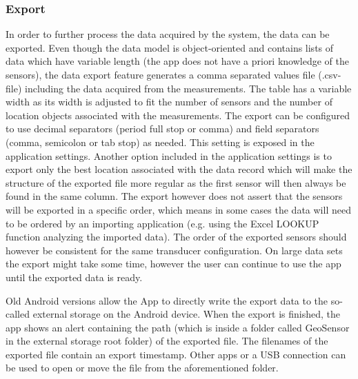\subsubsection{Export}
\label{subsubs:export}
In order to further process the data acquired by the system, the data can be exported. Even though the data model is object-oriented and contains lists of data which have variable length (the app does not have a priori knowledge of the sensors), the data export feature generates a comma separated values file (.csv-file) including the data acquired from the measurements. The table has a variable width as its width is adjusted to fit the number of sensors and the number of location objects associated with the measurements. The export can be configured to use decimal separators (period \/ full stop or comma) and field separators (comma, semicolon or tab stop) as needed. This setting is exposed in the application settings. Another option included in the application settings is to export only the best location associated with the data record which will make the structure of the exported file more regular as the first sensor will then always be found in the same column. The export however does not assert that the sensors will be exported in a specific order, which means in some cases the data will need to be ordered by an importing application (e.g. using the Excel LOOKUP function analyzing the imported data). The order of the exported sensors should however be consistent for the same transducer configuration. On large data sets the export might take some time, however the user can continue to use the app until the exported data is ready.

Old Android versions allow the App to directly write the export data to the so-called external storage on the Android device. When the export is finished, the app shows an alert containing the path (which is inside a folder called GeoSensor in the external storage root folder) of the exported file. The filenames of the exported file contain an export timestamp. Other apps or a USB connection can be used to open or move the file from the aforementioned folder.


